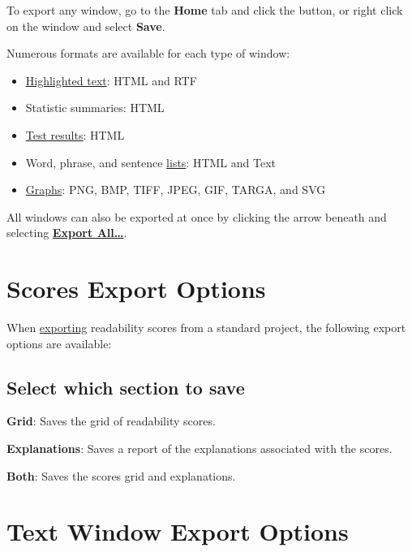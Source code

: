\documentclass[
]{book}
\providecommand{\tightlist}{%
  \setlength{\itemsep}{0pt}\setlength{\parskip}{0pt}}
\newenvironment{optionssection}
    {
    \begin{tcolorbox}[colframe=lightgray,colback=ultralightgray,sharp corners=all,parbox=false]
    }
    {
    \end{tcolorbox}
    }
\theoremstyle{definition}
\theoremstyle{definition}
\theoremstyle{definition}
\theoremstyle{definition}
\theoremstyle{remark}
\begin{document}
To export any window, go to the \textbf{Home} tab and click the  button, or right click on the window and select \textbf{Save}.

Numerous formats are available for each type of window:

\begin{itemize}
\tightlist
\item
  \protect\hyperlink{text-window-export}{Highlighted text}: HTML and RTF
\item
  Statistic summaries: HTML
\item
  \protect\hyperlink{scores-export}{Test results}: HTML
\item
  Word, phrase, and sentence \protect\hyperlink{export-list}{lists}: HTML and Text
\item
  \protect\hyperlink{image-export}{Graphs}: PNG, BMP, TIFF, JPEG, GIF, TARGA, and SVG
\end{itemize}

All windows can also be exported at once by clicking the arrow beneath  and selecting \protect\hyperlink{export-all-options}{\textbf{Export All\ldots{}}}.

\hypertarget{scores-export}{%
\section{Scores Export Options}\label{scores-export}}

When \protect\hyperlink{exporting}{exporting} readability scores from a standard project, the following export options are available:

\hypertarget{select-which-section-to-save}{%
\subsection*{Select which section to save}\label{select-which-section-to-save}}

\begin{optionssection}
\textbf{Grid}: Saves the grid of readability scores.

\textbf{Explanations}: Saves a report of the explanations associated with the scores.

\textbf{Both}: Saves the scores grid and explanations.

\end{optionssection}

\hypertarget{text-window-export}{%
\section{Text Window Export Options}\label{text-window-export}}
\end{document}
